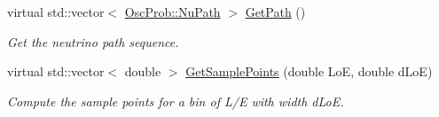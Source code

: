 \begin{DoxyCompactItemize}
virtual std\+::vector$<$ \hyperlink{structOscProb_1_1NuPath}{Osc\+Prob\+::\+Nu\+Path} $>$ \hyperlink{classOscProb_1_1PMNS__Base_ac8e196f2e85a2b1caaf705073ee95a5c}{Get\+Path} ()
\begin{DoxyCompactList}\small\item\em Get the neutrino path sequence. \end{DoxyCompactList}\item 
virtual std\+::vector$<$ double $>$ \hyperlink{classOscProb_1_1PMNS__Base_a9eac8d768c1424755ee41f7e783af179}{Get\+Sample\+Points} (double LoE, double d\+LoE)
\begin{DoxyCompactList}\small\item\em Compute the sample points for a bin of L/E with width d\+LoE. \end{DoxyCompactList}\end{DoxyCompactItemize}
